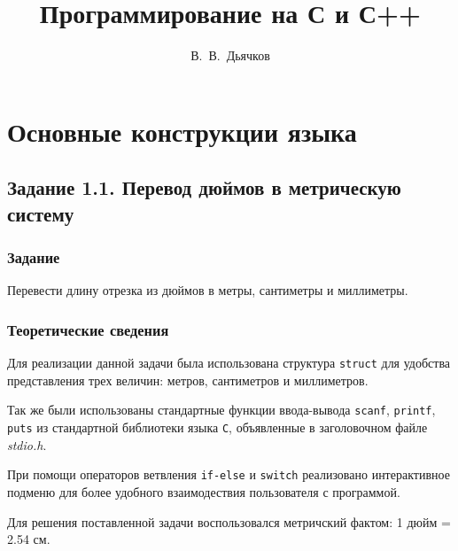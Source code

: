 \documentclass[12pt,a4paper]{report}
\author{В.~В.~Дьячков}
\title{Программирование на С и С++}
\begin{document}
\maketitle

\tableofcontents{}

\chapter{Основные конструкции языка}
\section{Задание 1.1. Перевод дюймов в метрическую систему}
\subsection{Задание}

\hspace{\parindent}Перевести длину отрезка из дюймов в метры, сантиметры и миллиметры.

\subsection{Теоретические сведения}
\hspace{\parindent}Для реализации данной задачи была использована структура \texttt{struct} для удобства представления трех величин: метров, сантиметров и миллиметров. 

Так же были использованы стандартные функции ввода-вывода \texttt{scanf}, \texttt{printf}, \texttt{puts} из стандартной библиотеки языка \verb+С+, объявленные в заголовочном файле \textit{stdio.h}.

При помощи операторов ветвления \texttt{if-else} и \texttt{switch} реализовано интерактивное подменю для более удобного взаимодествия пользователя с программой.

Для решения поставленной задачи воспользовался метричский фактом: 1 дюйм = 2.54 см.
\end{document}
